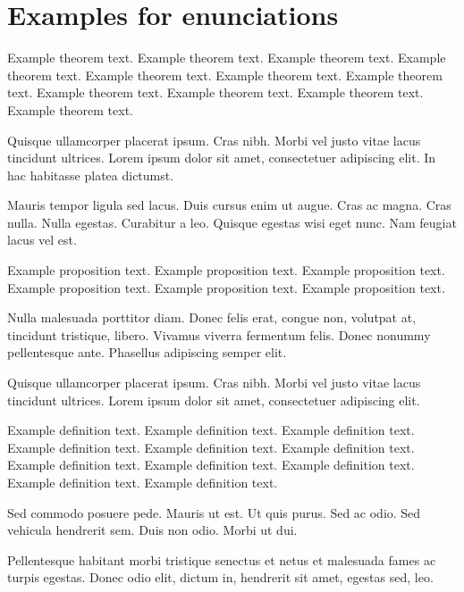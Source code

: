 \documentclass[proof]{WileyASNA-v1}
\begin{document}
\section{Examples for enunciations}\label{sec4}

\begin{theorem}\label{thm1}
Example theorem text. Example theorem text. Example theorem text. Example theorem text. Example theorem text. Example theorem text. Example theorem text. Example theorem text. Example theorem text. Example theorem text. Example theorem text. 
\end{theorem}

Quisque ullamcorper placerat ipsum. Cras nibh. Morbi vel justo vitae lacus tincidunt ultrices. Lorem ipsum dolor sit
amet, consectetuer adipiscing elit. In hac habitasse platea dictumst.

Mauris tempor ligula sed lacus. Duis cursus enim ut augue. Cras ac magna. Cras nulla.
Nulla egestas. Curabitur a leo. Quisque egestas wisi eget nunc. Nam feugiat lacus vel est.

\begin{proposition}
Example proposition text. Example proposition text. Example proposition text. Example proposition text. Example proposition text. Example proposition text. 
\end{proposition}

Nulla malesuada porttitor diam. Donec felis erat, congue non, volutpat at, tincidunt tristique, libero. Vivamus
viverra fermentum felis. Donec nonummy pellentesque ante. Phasellus adipiscing semper elit. 

Quisque ullamcorper placerat ipsum. Cras nibh. Morbi vel justo vitae lacus tincidunt ultrices. Lorem ipsum dolor sit
amet, consectetuer adipiscing elit. 

\begin{definition}
Example definition text. Example definition text. Example definition text. Example definition text. Example definition text. Example definition text. Example definition text. Example definition text. Example definition text. Example definition text. Example definition text.
\end{definition}

Sed commodo posuere pede. Mauris ut est. Ut quis purus. Sed ac odio. Sed vehicula hendrerit sem. Duis non
odio. Morbi ut dui.  

Pellentesque habitant morbi tristique senectus et netus et malesuada fames ac turpis egestas. Donec odio elit,
dictum in, hendrerit sit amet, egestas sed, leo. 
\end{document}
